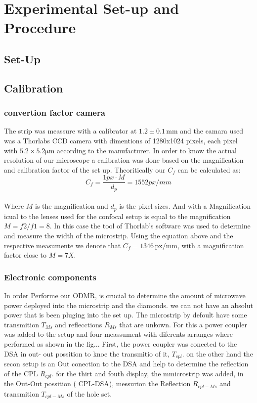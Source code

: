 \section{Experimental Set-up and Procedure}
\subsection{Set-Up}

\subsection{Calibration}
\subsubsection{convertion factor camera}
The strip was meassure with a calibrator at $1.2\pm 0.1\,\mathrm{mm}$ and the camara used was a Thorlabs CCD camera with dimentions of 1280x1024 pixels, each pixel with $5.2\times5.2 \mathrm{\mu m}$ according to the manufacturer.
In order to know the actual resolution of our microscope a calibration was done based on the magnification and calibration factor of the set up.
Theoritically our $C_{f}$ can be calculated as:
\\

\begin{equation}
C_{f}=\dfrac{1 px \cdot M}{d_{p}} = 1552 px/mm
\end{equation}\\
Where $M$ is the magnification and $d_{p}$ is the pixel sizes. And with a Magnification icual to the lenses used for the confocal setup is equal to the magnification $M=f2/f1=8$.
In this case the tool of Thorlab’s software was used to determine and measure the width of the microstrip. Using the equation above and the respective measumente we denote that  $C_{f} =1346 \,\mathrm{px/mm}$, with a magnification factor close to $M=7X$.


\subsubsection{Electronic components}

In order Performe our ODMR, is crucial to determine the amount of microwave power deployed into the microstrip and the diamonds. we can not have an absolut power that is been pluging into the set up. The microstrip by defoult have some transmition $T_{Ms}$ and reflecctions $R_{Ms}$ that are unkown.
For this a power coupler was added to the setup and four meassument with diferents arranges where performed as shown in the fig...
First, the power coupler was conected to the DSA in out- out possition to knoe the transmitio of it, $T_{cpl}$. on the other hand the secon setup is an Out conection to the DSA and help to determine the reflection of the CPL $R_{cpl}$. for the thirt and fouth display, the mmicrostrip was added, in the Out-Out possition ( CPL-DSA), messurion the Reflection $R_{cpl-Ms}$ and transmition $T_{cpl-Ms}$ of the hole set.

